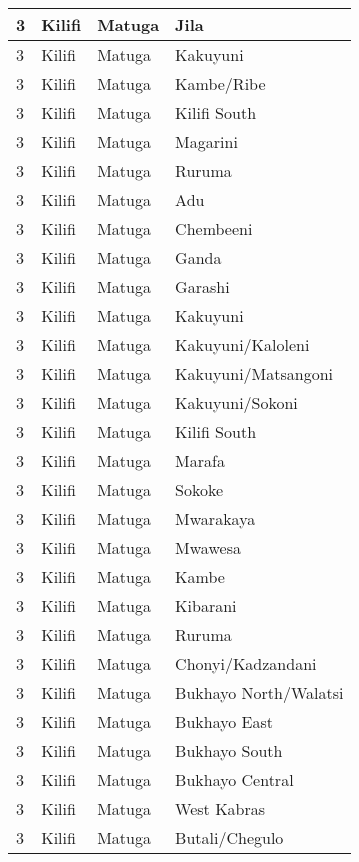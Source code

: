 \begin{table}[!ht]
\begin{tabular}{|l|l|l|l|}
        3 & Kilifi & Matuga & Jila \\ \hline
        3 & Kilifi & Matuga & Kakuyuni \\ \hline
        3 & Kilifi & Matuga & Kambe/Ribe \\ \hline
        3 & Kilifi & Matuga & Kilifi South \\ \hline
        3 & Kilifi & Matuga & Magarini \\ \hline
        3 & Kilifi & Matuga & Ruruma \\ \hline
        3 & Kilifi & Matuga & Adu \\ \hline
        3 & Kilifi & Matuga & Chembeeni \\ \hline
        3 & Kilifi & Matuga & Ganda \\ \hline
        3 & Kilifi & Matuga & Garashi \\ \hline
        3 & Kilifi & Matuga & Kakuyuni \\ \hline
        3 & Kilifi & Matuga & Kakuyuni/Kaloleni \\ \hline
        3 & Kilifi & Matuga & Kakuyuni/Matsangoni \\ \hline
        3 & Kilifi & Matuga & Kakuyuni/Sokoni \\ \hline
        3 & Kilifi & Matuga & Kilifi South \\ \hline
        3 & Kilifi & Matuga & Marafa \\ \hline
        3 & Kilifi & Matuga & Sokoke \\ \hline
        3 & Kilifi & Matuga & Mwarakaya \\ \hline
        3 & Kilifi & Matuga & Mwawesa \\ \hline
        3 & Kilifi & Matuga & Kambe \\ \hline
        3 & Kilifi & Matuga & Kibarani \\ \hline
        3 & Kilifi & Matuga & Ruruma \\ \hline
        3 & Kilifi & Matuga & Chonyi/Kadzandani \\ \hline
        3 & Kilifi & Matuga & Bukhayo North/Walatsi \\ \hline
        3 & Kilifi & Matuga & Bukhayo East \\ \hline
        3 & Kilifi & Matuga & Bukhayo South \\ \hline
        3 & Kilifi & Matuga & Bukhayo Central \\ \hline
        3 & Kilifi & Matuga & West Kabras \\ \hline
        3 & Kilifi & Matuga & Butali/Chegulo \\ \hline

\end{tabular}
\end{table}
